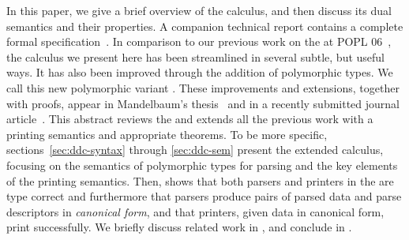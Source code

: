 


In this paper, we give a brief overview of the calculus,
and then discuss its dual semantics and their properties.  A companion technical
report contains a complete formal
specification~\cite{fisher+:popl-sub-long}.  In comparison to our
previous work on the \ddcold{} at POPL 06~\cite{fisher+:next700ddl},
the calculus we present here has been streamlined in several subtle,
but useful ways.  It has also been improved through the addition of
polymorphic types.  We call this new polymorphic variant
\ddc{}.  These improvements and extensions, together with
proofs, appear in Mandelbaum's thesis~\cite{mandelbaum:thesis} and in
a recently submitted journal article~\cite{fisher+:ddcjournal}.
This abstract reviews the \ddc{} and extends all the previous 
work with a printing semantics and appropriate theorems.
To be more specific,
sections~\ref{sec:ddc-syntax} through \ref{sec:ddc-sem} present the
extended \ddc{} calculus, focusing on the semantics of polymorphic
types for parsing and the key elements of the printing semantics.
Then,  shows that both parsers and
printers in the \ddc{} are type correct and furthermore that parsers
produce pairs of parsed data and parse descriptors in {\em canonical
  form}, and that printers, given data in canonical form, print
successfully. We briefly discuss related work in , and
conclude in .


